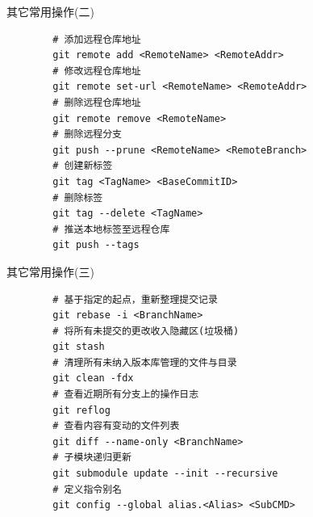 \begin{frame}[fragile]{其它常用操作(二)}
    \begin{lstlisting}
        # 添加远程仓库地址
        git remote add <RemoteName> <RemoteAddr>
        # 修改远程仓库地址
        git remote set-url <RemoteName> <RemoteAddr>
        # 删除远程仓库地址
        git remote remove <RemoteName>
        # 删除远程分支
        git push --prune <RemoteName> <RemoteBranch>
        # 创建新标签
        git tag <TagName> <BaseCommitID>
        # 删除标签
        git tag --delete <TagName>
        # 推送本地标签至远程仓库
        git push --tags
    \end{lstlisting}
\end{frame}

\begin{frame}[fragile]{其它常用操作(三)}
    \begin{lstlisting}
        # 基于指定的起点，重新整理提交记录
        git rebase -i <BranchName>
        # 将所有未提交的更改收入隐藏区(垃圾桶)
        git stash
        # 清理所有未纳入版本库管理的文件与目录
        git clean -fdx
        # 查看近期所有分支上的操作日志
        git reflog
        # 查看内容有变动的文件列表
        git diff --name-only <BranchName>
        # 子模块递归更新
        git submodule update --init --recursive
        # 定义指令别名
        git config --global alias.<Alias> <SubCMD>
    \end{lstlisting}
\end{frame}